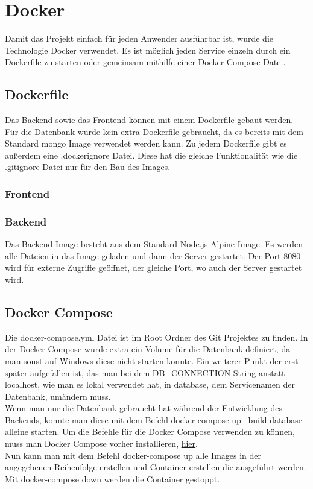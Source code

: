 \chapter{Docker}\label{ch:hosting}
Damit das Projekt einfach für jeden Anwender ausführbar ist, wurde die Technologie Docker verwendet. Es ist möglich jeden Service einzeln durch ein Dockerfile zu starten oder gemeinsam mithilfe einer Docker-Compose Datei.

\section{Dockerfile}
Das Backend sowie das Frontend können mit einem Dockerfile gebaut werden. Für die Datenbank wurde kein extra Dockerfile gebraucht, da es bereits mit dem Standard mongo Image verwendet werden kann. Zu jedem Dockerfile gibt es außerdem eine .dockerignore Datei. Diese hat die gleiche Funktionalität wie die .gitignore Datei nur für den Bau des Images.

\subsection{Frontend}

\subsection{Backend}
Das Backend Image besteht aus dem Standard Node.js Alpine Image. Es werden alle Dateien in das Image geladen und dann der Server gestartet. Der Port 8080 wird für externe Zugriffe geöffnet, der gleiche Port, wo auch der Server gestartet wird.

\section{Docker Compose}
Die docker-compose.yml Datei ist im Root Ordner des Git Projektes zu finden.
In der Docker Compose wurde extra ein Volume für die Datenbank definiert, da man sonst auf Windows diese nicht starten konnte. Ein weiterer Punkt der erst später aufgefallen ist, das man bei dem DB\_CONNECTION String anstatt localhost, wie man es lokal verwendet hat, in database, dem Servicenamen der Datenbank, umändern muss.\\
Wenn man nur die Datenbank gebraucht hat während der Entwicklung des Backends, konnte man diese mit dem Befehl docker-compose up --build database alleine starten. Um die Befehle für die Docker Compose verwenden zu können, muss man Docker Compose vorher installieren, \hyperlink{https://docs.docker.com/compose/install/}{hier}.\\
Nun kann man mit dem Befehl docker-compose up alle Images in der angegebenen Reihenfolge erstellen und Container erstellen die ausgeführt werden. Mit docker-compose down werden die Container gestoppt.

